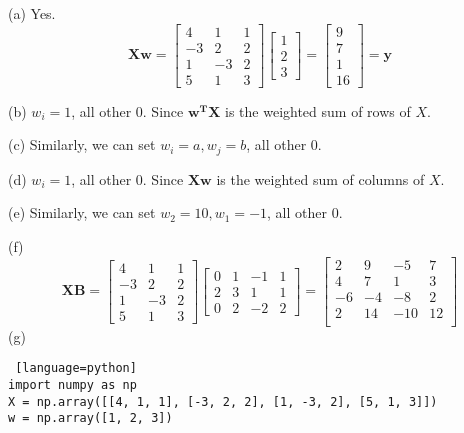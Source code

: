 \documentclass[a4paper, 12pt]{article}
\begin{document}
\begin{problem}
\end{problem}
\begin{solution}
    (a) Yes.\[
        \mathbf{Xw} = \begin{bmatrix}
            4  & 1  & 1 \\
            -3 & 2  & 2 \\
            1  & -3 & 2 \\
            5  & 1  & 3
        \end{bmatrix}\begin{bmatrix}
            1 \\
            2 \\
            3
        \end{bmatrix} = \begin{bmatrix}
            9 \\
            7 \\
            1 \\
            16
        \end{bmatrix} = \mathbf{y}
    \]

    (b) $w_i = 1$, all other 0. Since $\mathbf{w^T X}$ is the weighted sum of rows of $X$. 

    (c) Similarly, we can set $w_i = a, w_j = b$, all other 0.

    (d) $w_i = 1$, all other 0. Since $\mathbf{Xw}$ is the weighted sum of columns of $X$.

    (e) Similarly, we can set $w_2 = 10, w_1 = -1$, all other 0.

    (f) \[
        \mathbf{XB} = \begin{bmatrix}
            4  & 1  & 1 \\
            -3 & 2  & 2 \\
            1  & -3 & 2 \\
            5  & 1  & 3
        \end{bmatrix} \begin{bmatrix}
            0 & 1 & -1 & 1 \\
            2 & 3 & 1  & 1 \\
            0 & 2 & -2 & 2
        \end{bmatrix} = \begin{bmatrix}
            2  & 9  & -5  & 7  \\
            4  & 7  & 1   & 3  \\
            -6 & -4 & -8  & 2  \\
            2  & 14 & -10 & 12 \\
        \end{bmatrix}
    \]
    (g)
    \begin{lstlisting} [language=python]
import numpy as np
X = np.array([[4, 1, 1], [-3, 2, 2], [1, -3, 2], [5, 1, 3]])
w = np.array([1, 2, 3])


\end{lstlisting}
\end{solution}
\end{document}
